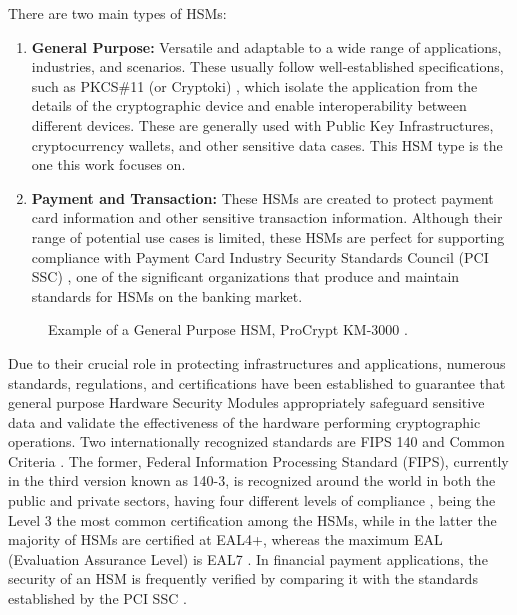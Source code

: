 There are two main types of HSMs:
\begin{enumerate}
    \item \textbf{General Purpose:} Versatile and adaptable to a wide range of applications, industries, and scenarios. These usually follow well-established specifications, such as PKCS\#11 (or Cryptoki) \cite{pkcs11spec}, which isolate the application from the details of the cryptographic device and enable interoperability between different devices. These are generally used with Public Key Infrastructures, cryptocurrency wallets, and other sensitive data cases. This HSM type is the one this work focuses on.
    
    \item \textbf{Payment and Transaction:} These HSMs are created to protect payment card information and other sensitive transaction information. Although their range of potential use cases is limited, these HSMs are perfect for supporting compliance with Payment Card Industry Security Standards Council (PCI SSC) \cite{pcissc}, one of the significant organizations that produce and maintain standards for HSMs on the banking market.
\end{enumerate}

\begin{figure}[h]
    \begin{center}
    \end{center}
    \caption{Example of a General Purpose HSM, ProCrypt KM-3000 \cite{procrypthsm}.}
    \label{fig:hsm-example}
\end{figure}

Due to their crucial role in protecting infrastructures and applications, numerous standards, regulations, and certifications have been established to guarantee that general purpose Hardware Security Modules appropriately safeguard sensitive data and validate the effectiveness of the hardware performing cryptographic operations. Two internationally recognized standards are FIPS 140 \cite{fips140} and Common Criteria \cite{commoncriteria}. The former, Federal Information Processing Standard (FIPS), currently in the third version known as 140-3, is recognized around the world in both the public and private sectors, having four different levels of compliance \cite{fipslevels}, being the Level 3 the most common certification among the HSMs, while in the latter the majority of HSMs are certified at EAL4+, whereas the maximum EAL (Evaluation Assurance Level) is EAL7 \cite{commoncriteriacert}. In financial payment applications, the security of an HSM is frequently verified by comparing it with the standards established by the PCI SSC \cite{pcissc}.

